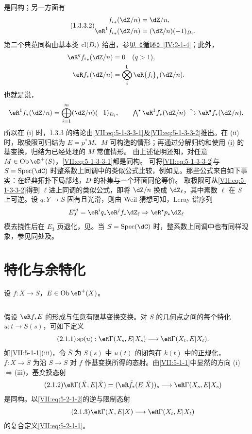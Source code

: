 是同构；另一方面有
\begin{equation*}\tag{1.3.3.2}\label{VII:eq:5-1-3-3-2}
 \begin{aligned}
 {f_i}_\ast(\dZ/n)&=\dZ/n,\\
 \eR^1{f_i}_\ast(\dZ/n)&=(\dZ/n)(-1)_{D_i}.
 \end{aligned}
\end{equation*}
第二个典范同构由基本类 $\operatorname{cl}(D_i)$ 给出，参见\hyperref[IV]{《循环》}\ref{IV:2-1-4}；此外，
\begin{align*}
 \eR^q{f_i}_\ast(\dZ/n)&=0\quad(q>1),\\
 \eR f_\ast(\dZ/n)&=\bigotimes_i^{\mathsf L}\eR{f_i}_\ast(\dZ/n).
\end{align*}
也就是说，
\[
 \eR^1f_\ast(\dZ/n)=\bigoplus_{i=1}^m(\dZ/n)(-1)_{D_i},\qquad
 \textstyle\bigwedge^\bullet\eR^1f_\ast(\dZ/n)\iso\eR^\bullet f_\ast(\dZ/n).
\]
所以在 (i) 时，1.3.3 的结论由\eqref{VII:eq:5-1-3-3-1}及\eqref{VII:eq:5-1-3-3-2}推出。在 (ii) 时，取极限可归结为 $E=p^\ast M$、$M$ 可构造的情形；再通过分解归约和使用 (i) 的基变换，归结为已经处理的 $M$ 常值情形。
由上述证明还知，对任意 $M\in\ob\eD^+(S)$，\eqref{VII:eq:5-1-3-3-1}都是同构。
可将\eqref{VII:eq:5-1-3-3-2}与 $S=\spec(\dC)$ 时整系数上同调中的类似公式比较，例如见\cite[3.1]{de71-2}。那些公式来自如下事实：在经典拓扑下局部地，$D$ 的补集与一个环面同伦等价。
取极限可从\eqref{VII:eq:5-1-3-3-2}得到 $\ell$进上同调的类似公式，即将 $\dZ/n$ 换成 $\dZ_\ell$，其中素数 $\ell$ 在 $S$ 上可逆。设 $q:Y\to S$ 固有且光滑，则由 Weil 猜想\cite{de74,de80}可知，Leray 谱序列
\[
 E_2^{ij}=\eR^i q_\ast\eR^j f_\ast\dZ_\ell\Rightarrow\eR^\bullet p_\ast\dZ_\ell
\]
模去挠性后在 $E_3$ 页退化，见\cite[第6节]{de71-1}。当 $S=\spec(\dC)$ 时，整系数上同调中也有同样现象，参见同处及\cite[3.2.13]{de71-2}。

\section{特化与余特化}\label{VII:5-2}
设 $f:X\to S$，$E\in\ob\eD^+(X)$。
\subsection{}\label{VII:5-2-1}
假设 $\eR f_\ast E$ 的形成与任意有限基变换交换。对 $S$ 的几何点之间的每个特化 $u:t\to S(s)$，可如下定义
\begin{equation*}\tag{2.1.1}\label{VII:eq:5-2-1-1}
 \spe(u):\eR\Gamma(X_s,E|X_s)\longrightarrow\eR\Gamma(X_t,E|X_t).
\end{equation*}
如\ref{VII:5-1-1}(iii)，令 $\bar S$ 为 $S(s)$ 中 $u(t)$ 的闭包在 $k(t)$ 中的正规化，$\bar f:\bar X\to\bar S$ 为沿 $\bar S\to S$ 对 $f$ 作基变换所得的态射。由\ref{VII:5-1-1}中显然的方向 (i)$\Rightarrow$(iii)，基变换态射
\begin{equation*}\tag{2.1.2}\label{VII:eq:5-2-1-2}
 \eR\Gamma(\bar X,E|\bar X)=(\eR\bar f_\ast(E|\bar X))_s\longrightarrow\eR\Gamma(X_s,E|X_s)
\end{equation*}
是同构。以\eqref{VII:eq:5-2-1-2}的逆与限制态射
\begin{equation*}\tag{2.1.3}\label{VII:eq:5-2-1-3}
 \eR\Gamma(\bar X,E|\bar X)\longrightarrow\eR\Gamma(X_t,E|X_t)
\end{equation*}
的复合定义\eqref{VII:eq:5-2-1-1}。
